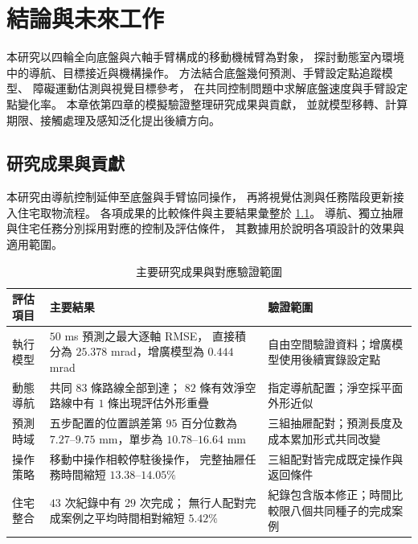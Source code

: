 \chapter{結論與未來工作}
\label{c:conclusions}

本研究以四輪全向底盤與六軸手臂構成的移動機械臂為對象，
探討動態室內環境中的導航、目標接近與機構操作。
方法結合底盤幾何預測、手臂設定點追蹤模型、
障礙運動估測與視覺目標參考，
在共同控制問題中求解底盤速度與手臂設定點變化率。
本章依第四章的模擬驗證整理研究成果與貢獻，
並就模型移轉、計算期限、接觸處理及感知泛化提出後續方向。

\section{研究成果與貢獻}
\label{sec:research_results_contributions}

本研究由導航控制延伸至底盤與手臂協同操作，
再將視覺估測與任務階段更新接入住宅取物流程。
各項成果的比較條件與主要結果彙整於
\cref{tab:ch5_results_summary}。
導航、獨立抽屜與住宅任務分別採用對應的控制及評估條件，
其數據用於說明各項設計的效果與適用範圍。

\begin{table}[htbp]
    \centering
    \caption{主要研究成果與對應驗證範圍}
    \label{tab:ch5_results_summary}
    \begingroup
    \small
    \renewcommand{\arraystretch}{1.25}
    \begin{tabular}{p{} p{} p{}}
        \hline
        評估項目 & 主要結果 & 驗證範圍 \\
        \hline
        執行模型
        & $50$ ms 預測之最大逐軸 RMSE，
          直接積分為 $25.378$ mrad，增廣模型為 $0.444$ mrad
        & 自由空間驗證資料；增廣模型使用後續實錄設定點 \\
        動態導航
        & 共同 $83$ 條路線全部到達；
          $82$ 條有效淨空路線中有 $1$ 條出現評估外形重疊
        & 指定導航配置；淨空採平面外形近似 \\
        預測時域
        & 五步配置的位置誤差第 $95$ 百分位數為
          $7.27$--$9.75$ mm，單步為 $10.78$--$16.64$ mm
        & 三組抽屜配對；預測長度及成本累加形式共同改變 \\
        操作策略
        & 移動中操作相較停駐後操作，
          完整抽屜任務時間縮短 $13.38$--$14.05\%$
        & 三組配對皆完成既定操作與返回條件 \\
        住宅整合
        & $43$ 次紀錄中有 $29$ 次完成；
          無行人配對完成案例之平均時間相對縮短 $5.42\%$
        & 紀錄包含版本修正；時間比較限八個共同種子的完成案例 \\
        \hline
    \end{tabular}
    \endgroup
\end{table}

